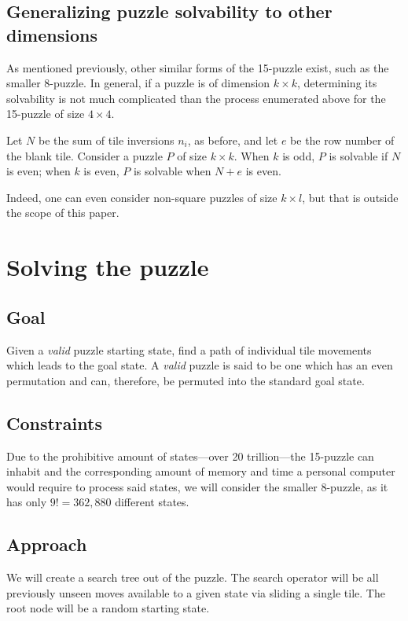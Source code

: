 \documentclass{article}
\begin{document}
  \subsection*{Generalizing puzzle solvability to other dimensions}
    As mentioned previously, other similar forms of the 15-puzzle exist, such as
    the smaller 8-puzzle. In general, if a puzzle is of dimension $k\times k$,
    determining its solvability is not much complicated than the process
    enumerated above for the 15-puzzle of size $4\times 4$.

    Let $N$ be the sum of tile inversions $n_i$, as before, and let $e$ be the
    row number of the blank tile. Consider a puzzle $P$ of size $k\times k$.
    When $k$ is odd, $P$ is solvable if $N$ is even; when $k$ is even, $P$ is
    solvable when $N+e$ is even.

    Indeed, one can even consider non-square puzzles of size $k\times l$, but
    that is outside the scope of this paper.

\section*{Solving the puzzle}
  \subsection*{Goal}
    Given a \textit{valid} puzzle starting state, find a path of individual tile
    movements which leads to the goal state. A \textit{valid} puzzle is said to
    be one which has an even permutation and can, therefore, be permuted into
    the standard goal state.

  \subsection*{Constraints}
    Due to the prohibitive amount of states---over 20 trillion---the 15-puzzle
    can inhabit and the corresponding amount of memory and time a personal
    computer would require to process said states, we will consider the smaller
    8-puzzle, as it has only $9!=362,880$ different states.

  \subsection*{Approach}
    We will create a search tree out of the puzzle. The search operator will
    be all previously unseen moves available to a given state via sliding a
    single tile. The root node will be a random starting state.
\end{document}
